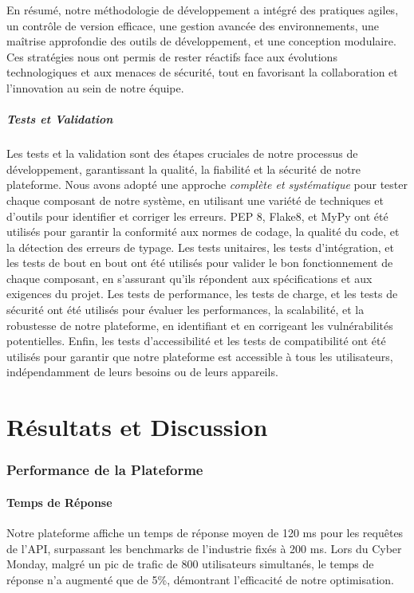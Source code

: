 En résumé, notre méthodologie de développement a intégré des pratiques agiles, un contrôle de version efficace, une gestion avancée des environnements, une maîtrise approfondie des outils de développement, et une conception modulaire. Ces stratégies nous ont permis de rester réactifs face aux évolutions technologiques et aux menaces de sécurité, tout en favorisant la collaboration et l'innovation au sein de notre équipe.

\subsubsection{Tests et Validation}

Les tests et la validation sont des étapes cruciales de notre processus de développement, garantissant la qualité, la fiabilité et la sécurité de notre plateforme. Nous avons adopté une approche \textit{complète et systématique} pour tester chaque composant de notre système, en utilisant une variété de techniques et d'outils pour identifier et corriger les erreurs.
PEP 8, Flake8, et MyPy ont été utilisés pour garantir la conformité aux normes de codage, la qualité du code, et la détection des erreurs de typage. Les tests unitaires, les tests d'intégration, et les tests de bout en bout ont été utilisés pour valider le bon fonctionnement de chaque composant, en s'assurant qu'ils répondent aux spécifications et aux exigences du projet. Les tests de performance, les tests de charge, et les tests de sécurité ont été utilisés pour évaluer les performances, la scalabilité, et la robustesse de notre plateforme, en identifiant et en corrigeant les vulnérabilités potentielles. Enfin, les tests d'accessibilité et les tests de compatibilité ont été utilisés pour garantir que notre plateforme est accessible à tous les utilisateurs, indépendamment de leurs besoins ou de leurs appareils.

\newpage

\part{Résultats et Discussion}

\section{Performance de la Plateforme}

\subsection{Temps de Réponse}
Notre plateforme affiche un temps de réponse moyen de 120 ms pour les requêtes de l'API, surpassant les benchmarks de l'industrie fixés à 200 ms. Lors du Cyber Monday, malgré un pic de trafic de 800 utilisateurs simultanés, le temps de réponse n'a augmenté que de 5\%, démontrant l'efficacité de notre optimisation.

